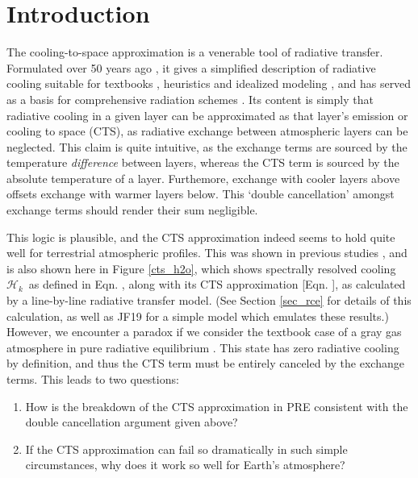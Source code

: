 \documentclass[10pt]{article}
\newcommand{\ch}{\ensuremath{\mathcal{H}}}
\newcommand{\chk}{\ensuremath{\ch_k}}
\begin{document}
%
%


\section {Introduction}
The cooling-to-space approximation is a venerable tool of radiative transfer. Formulated over 50 years ago \citep{zagoni2016, green1967, rodgers1966}, it gives a simplified description of radiative cooling suitable for textbooks \citep{wallace2006,petty2006,thomas2002}, heuristics and idealized modeling \citep{jeevanjee2019,jeevanjee2018}, and  has served as a basis for comprehensive radiation schemes  \citep[][]{joseph1976,fels1975,rodgers1966}. Its content is simply that radiative cooling in a given layer can be approximated as that layer's emission or cooling to space (CTS), as radiative exchange between atmospheric layers can be neglected. This claim  is quite intuitive, as  the  exchange terms   are sourced by the temperature \emph{difference} between layers, whereas the CTS term is sourced by the absolute temperature of a layer. Furthemore,   exchange with cooler layers above  offsets  exchange with warmer layers below. This `double cancellation' amongst exchange terms should render their sum negligible.

This logic is plausible, and the CTS approximation indeed seems to hold quite well for terrestrial atmospheric profiles. This  was shown in previous studies \citep[e.g.][]{clough1992,rodgers1966}, and is  also shown here in Figure \ref{cts_h2o}, which shows spectrally resolved cooling \chk\ as defined in Eqn. , along with its CTS approximation [Eqn. ], as calculated by a line-by-line radiative transfer model. (See Section \ref{sec_rce} for details of this calculation, as well as JF19 for a simple model which emulates these results.) However,  we encounter a paradox if we consider the textbook case of a gray gas atmosphere in pure radiative equilibrium \citep[PRE, e.g.][hereafter P10]{pierrehumbert2010}. This state has zero radiative cooling by definition, and thus the CTS term must be entirely canceled by the exchange terms.  This leads to two questions:

\begin{enumerate}
	\item How is the breakdown of the CTS approximation in PRE consistent  with the double cancellation argument given above?  \label{pre_invalid}
	\item If the CTS approximation can fail so dramatically in such simple circumstances, why does it work so well for Earth's atmosphere? \label{rce_valid}
\end{enumerate}
\end{document}
